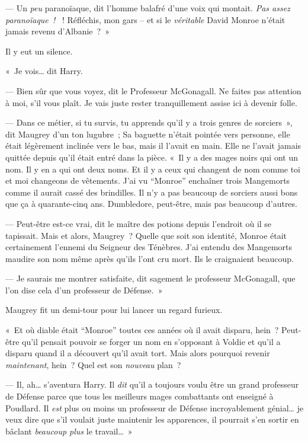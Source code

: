 --- Un \emph{peu} paranoïaque, dit l'homme balafré d'une voix qui montait.
\emph{Pas assez paranoïaque~!
}~!
Réfléchis, mon gars -- et si le \emph{véritable} David Monroe n'était jamais revenu d'Albanie~?~»

Il y eut un silence.

«~Je vois… dit Harry.

--- Bien sûr que vous voyez, dit le Professeur McGonagall.
Ne faites pas attention à moi, s'il vous plaît.
Je vais juste rester tranquillement assise ici à devenir folle.

--- Dans ce métier, si tu survis, tu apprends qu'il y a trois genres de sorciers~», dit Maugrey d'un ton lugubre~; Sa baguette n'était pointée vers personne, elle était légèrement inclinée vers le bas, mais il l'avait en main.
Elle ne l'avait jamais quittée depuis qu'il était entré dans la pièce.
«~Il y a des mages noirs qui ont un nom.
Il y en a qui ont deux noms.
Et il y a ceux qui changent de nom comme toi et moi changeons de vêtements.
J'ai vu “Monroe” enchaîner trois Mangemorts comme il aurait cassé des brindilles.
Il n'y a pas beaucoup de sorciers aussi bons que ça à quarante-cinq ans.
Dumbledore, peut-être, mais pas beaucoup d'autres.

--- Peut-être est-ce vrai, dit le maître des potions depuis l'endroit où il se tapissait.
Mais et alors, Maugrey~?
Quelle que soit son identité, Monroe était certainement l'ennemi du Seigneur des Ténèbres.
J'ai entendu des Mangemorts maudire son nom même après qu'ils l'ont cru mort.
Ils le craignaient beaucoup.

--- Je saurais me montrer satisfaite, dit sagement le professeur McGonagall, que l'on dise cela d'un professeur de Défense.~»

Maugrey fit un demi-tour pour lui lancer un regard furieux.

«~Et où diable était “Monroe” toutes ces années où il avait disparu, hein~?
Peut-être qu'il pensait pouvoir se forger un nom en s'opposant à Voldie et qu'il a disparu quand il a découvert qu'il avait tort.
Mais alors pourquoi revenir \emph{maintenant}, hein~?
Quel est son \emph{nouveau} plan~?

--- Il, ah… s'aventura Harry.
Il \emph{dit} qu'il a toujours voulu être un grand professeur de Défense parce que tous les meilleurs mages combattants ont enseigné à Poudlard.
Il \emph{est} plus ou moins un professeur de Défense incroyablement génial… je veux dire que s'il voulait juste maintenir les apparences, il pourrait s'en sortir en bâclant \emph{beaucoup plus} le travail…~»

